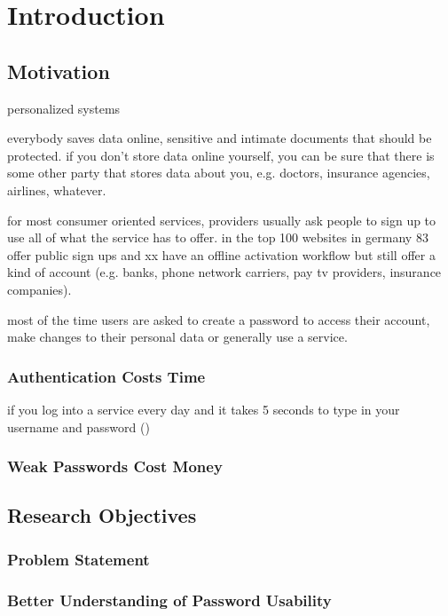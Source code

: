 
\chapter[Introduction]{Introduction}\label{chap:intro}


\section{Motivation}
personalized systems


everybody saves data online, sensitive and intimate documents that should be protected.
if you don't store data online yourself, you can be sure that there is some other party
that stores data about you, e.g. doctors, insurance agencies, airlines, whatever. 

for most consumer oriented services, providers usually ask people to sign up to use
all of what the service has to offer. in the top 100 websites in germany 83 offer public sign ups and xx have an offline activation workflow but still offer a kind of account (e.g. banks, phone network carriers, pay tv providers, insurance companies). 

most of the time users are asked to create a password to access their account, make changes to their personal data or generally use a service. \ar




\subsection{Authentication Costs Time}
if you log into a service every day and it takes 5 seconds to type in your username and password ()


\subsection{Weak Passwords Cost Money}

\section{Research Objectives}
\subsection{Problem Statement}
\subsection{Better Understanding of Password Usability}

